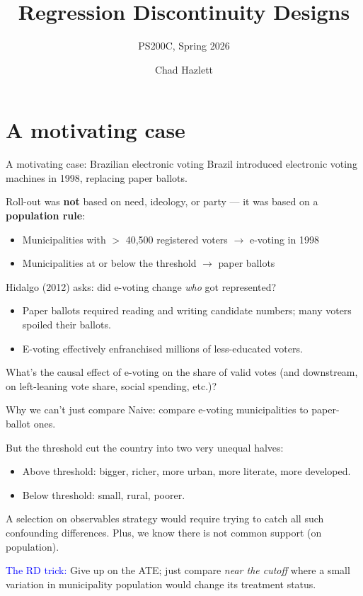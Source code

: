 \documentclass[handout,xcolor=dvipsnames]{beamer}
\title[]{Regression Discontinuity Designs}
\subtitle[ ]{PS200C, Spring 2026}
\author[Hazlett]{Chad Hazlett}
\institute[UCLA]{UCLA\\[1ex]
  \texttt{chazlett@ucla.edu}
}
\date{}
\begin{document}
\begin{frame}
  \titlepage
\end{frame}


\section{A motivating case}

\begin{frame}{A motivating case: Brazilian electronic voting}
\small
{} Brazil introduced electronic voting machines in 1998, replacing paper ballots. \medskip

 Roll-out was \textbf{not} based on need, ideology, or party --- it was based on a \textbf{population rule}: \\
\smallskip
\begin{itemize}
  \item Municipalities with $>$ 40,500 registered voters $\rightarrow$ e-voting in 1998
  \item Municipalities at or below the threshold $\rightarrow$ paper ballots
\end{itemize}
\medskip
{} Hidalgo (2012) asks: did e-voting change \textit{who} got represented?
\smallskip
\begin{itemize}
  \item Paper ballots required reading and writing candidate numbers; many voters spoiled their ballots.
  \item E-voting effectively enfranchised millions of less-educated voters.
\end{itemize}
\medskip
{} What's the causal effect of e-voting on the share of valid votes (and downstream, on left-leaning vote share, social spending, etc.)?
\end{frame}


\begin{frame}{Why we can't just compare}
\small
{} Naive: compare e-voting municipalities to paper-ballot ones. \medskip

 But the threshold cut the country into two very unequal halves: \\
\smallskip
\begin{itemize}
  \item Above threshold: bigger, richer, more urban, more literate, more developed.
  \item Below threshold: small, rural, poorer.
\end{itemize}
\medskip
{} A selection on observables strategy would require trying to catch all such confounding differences. Plus, we know there is not common support (on population). \medskip

 \textcolor{Blue}{The RD trick:} Give up on the ATE; just compare \textit{near the cutoff} where a small variation in municipality population would change its treatment status. 
\end{frame}
\end{document}
